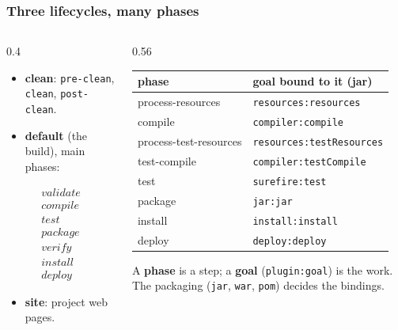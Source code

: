\documentclass[aspectratio=169,10pt,compress]{beamer}
\begin{document}
\begin{frame}[t,fragile] \frametitle{Three lifecycles, many phases}
  \begin{columns}[T]
    \begin{column}{0.4\textwidth}
      \begin{itemize}\small
        \item \textbf{clean}: \texttt{pre-clean}, \texttt{clean}, \texttt{post-clean}.
        \item \textbf{default} (the build), main phases:
      \end{itemize}
      \[
      	\begin{array}{l}
      		\mathit{validate} \\ \mathit{compile} \\ \mathit{test} \\ \mathit{package} \\ \mathit{verify} \\ \mathit{install} \\ \mathit{deploy}
      	\end{array}
      \]
      \begin{itemize}\small
        \item \textbf{site}: project web pages.
      \end{itemize}
    \end{column}
    \begin{column}{0.56\textwidth}
      \begin{center}\footnotesize
      \begin{tabular}{@{}ll@{}}
        \toprule
        \textbf{phase}            & \textbf{goal bound to it (jar)} \\
        \midrule
        process-resources          & \texttt{resources:resources} \\
        compile                    & \texttt{compiler:compile} \\
        process-test-resources     & \texttt{resources:testResources} \\
        test-compile               & \texttt{compiler:testCompile} \\
        test                       & \texttt{surefire:test} \\
        package                    & \texttt{jar:jar} \\
        install                    & \texttt{install:install} \\
        deploy                     & \texttt{deploy:deploy} \\
        \bottomrule
      \end{tabular}
      \end{center}
      \small A \textbf{phase} is a step; a \textbf{goal} (\texttt{plugin:goal}) is the work. The packaging (\texttt{jar}, \texttt{war}, \texttt{pom}) decides the bindings.
    \end{column}
  \end{columns}
\end{frame}
\end{document}
